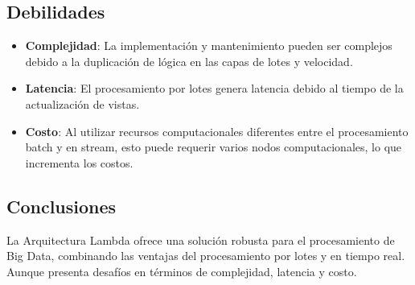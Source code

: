 \subsection{Debilidades}
\begin{itemize}
\item \textbf{Complejidad}: La implementación y mantenimiento pueden ser complejos debido a la duplicación de lógica en las capas de lotes y velocidad.
\item \textbf{Latencia}: El procesamiento por lotes genera latencia debido al tiempo de la actualización de vistas.
\item \textbf{Costo}: Al utilizar recursos computacionales diferentes entre el procesamiento batch y en stream, esto puede requerir varios nodos computacionales, lo que incrementa los costos.
\end{itemize}

\subsection{Conclusiones}
La Arquitectura Lambda ofrece una solución robusta para el procesamiento de Big Data, combinando las ventajas del procesamiento por lotes y en tiempo real. Aunque presenta desafíos en términos de complejidad, latencia y costo.
\newpage